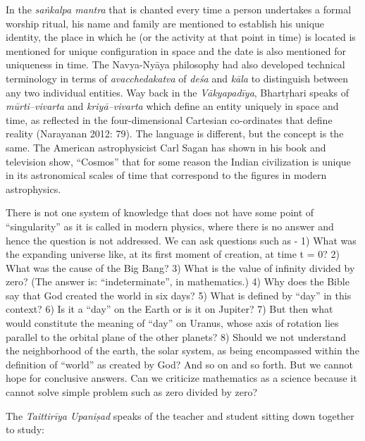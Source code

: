 In the \textit{saṅkalpa mantra} that is chanted every time a person undertakes a formal worship ritual, his name and family are mentioned to establish his unique identity, the place in which he (or the activity at that point in time) is located is mentioned for unique configuration in space and the date is also mentioned for uniqueness in time. The Navya-Nyāya philosophy had also developed technical terminology in terms of \textit{avacchedakatva} of \textit{deśa} and \textit{kāla} to distinguish between any two individual entities. Way back in the \textit{Vākyapadīya}, Bhartṛhari speaks of \textit{mūrti--vivarta} and \textit{kriyā--vivarta} which define an entity uniquely in space and time, as reflected in the four-dimensional Cartesian co-ordinates that define reality (Narayanan 2012: 79). The language is different, but the concept is the same. The American astrophysicist Carl Sagan has shown in his book and television show, “Cosmos” that for some reason the Indian civilization is unique in its astronomical scales of time that correspond to the figures in modern astrophysics.

There is not one system of knowledge that does not have some point of “singularity” as it is called in modern physics, where there is no answer and hence the question is not addressed. We can ask questions such as - 1) What was the expanding universe like, at its first moment of creation, at time t = 0? 2) What was the cause of the Big Bang? 3) What is the value of infinity divided by zero? (The answer is: “indeterminate”, in mathematics.) 4) Why does the Bible say that God created the world in six days? 5) What is defined by “day” in this context? 6) Is it a “day” on the Earth or is it on Jupiter? 7) But then what would constitute the meaning of “day” on Uranus, whose axis of rotation lies parallel to the orbital plane of the other planets? 8) Should we not understand the neighborhood of the earth, the solar system, as being encompassed within the definition of “world” as created by God? And so on and so forth. But we cannot hope for conclusive answers. Can we criticize mathematics as a science because it cannot solve simple problem such as zero divided by zero?

The \textit{Taittirīya Upaniṣad} speaks of the teacher and student sitting down together to study: 

